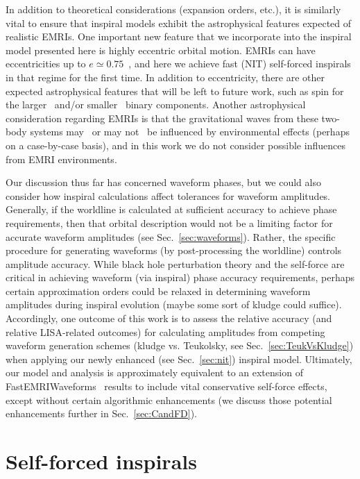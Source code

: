 \documentclass[aps,prd,twocolumn,showpacs,notitlepage,eqsecnum,
superscriptaddress,nofootinbib]{revtex4-1}
\begin{document}
In addition to theoretical considerations (expansion orders, etc.), it is similarly vital to ensure that inspiral models exhibit the astrophysical features expected of realistic EMRIs. One important new feature that we incorporate into the inspiral model presented here is highly eccentric orbital motion. EMRIs can have eccentricities up to $e\simeq 0.75$~\cite{HopmAlex05}, and here we achieve fast (NIT) self-forced inspirals in that regime for the first time. In addition to eccentricity, there are other expected astrophysical features that will be left to future work, such as spin for the larger~\cite{WarbBara11,Vand16,Vand18,NasiOsbu19,nasipak2021resonant} and/or smaller~\cite{BurkKhan15,WarbOsbu17,Piovano_2020,Ruangsri_2016} binary components. Another astrophysical consideration regarding EMRIs is that the gravitational waves from these two-body systems may~\cite{BongHuan19} or may not~\cite{BaraCard14} be influenced by environmental effects (perhaps on a case-by-case basis), and in this work we do not consider possible influences from EMRI environments.

Our discussion thus far has concerned waveform phases, but we could also consider how inspiral calculations affect tolerances for waveform amplitudes. Generally, if the worldline is calculated at sufficient accuracy to achieve phase requirements, then that orbital description would not be a limiting factor for accurate waveform amplitudes (see Sec.~\ref{sec:waveforms}). Rather, the specific procedure for generating waveforms (by post-processing the worldline) controls amplitude accuracy. While black hole perturbation theory and the self-force are critical in achieving waveform (via inspiral) phase accuracy requirements, perhaps certain approximation orders could be relaxed in determining waveform amplitudes during inspiral evolution (maybe some sort of kludge could suffice). Accordingly, one outcome of this work is to assess the relative accuracy (and relative LISA-related outcomes) for calculating amplitudes from competing waveform generation schemes (kludge vs. Teukolsky, see Sec.~\ref{sec:TeukVsKludge}) when applying our newly enhanced (see Sec.~\ref{sec:nit}) inspiral model. Ultimately, our model and analysis is approximately equivalent to an extension of FastEMRIWaveforms~\cite{Chua_2021,katz2021fastemriwaveforms} results to include vital conservative self-force effects, except without certain algorithmic enhancements (we discuss those potential enhancements further in Sec.~\ref{sec:CandFD}).

\section{Self-forced inspirals}
\label{sec:inspirals}
\end{document}
